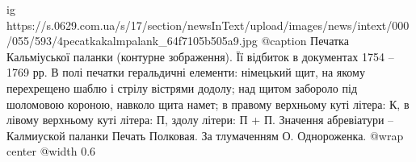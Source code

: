  
 
 
 
 

\ifcmt
  ig https://s.0629.com.ua/s/17/section/newsInText/upload/images/news/intext/000/055/593/4pecatkakalmpalank_64f7105b505a9.jpg
  @caption Печатка Кальміуської паланки (контурне зображення). Її відбиток в документах 1754 – 1769 рр. В полі печатки геральдичні елементи: німецький щит, на якому перехрещено шаблю і стрілу вістрями додолу; над щитом забороло під шоломовою короною, навколо щита намет; в правому верхньому куті літера: К, в лівому верхньому куті літера: П, здолу літери: П + П. Значення абревіатури – Калмиуской паланки Печать Полковая. За тлумаченням О. Однороженка.
  @wrap center
  @width 0.6
\fi
